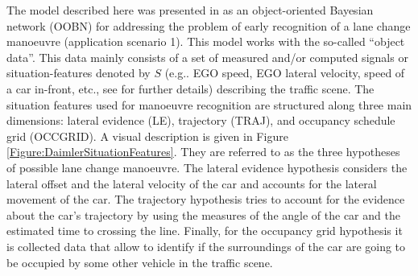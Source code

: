 The model described here was presented in \cite{kasper2012object} as an object-oriented Bayesian network  (OOBN) \cite{koller1997object} for addressing the problem of early recognition of a lane change manoeuvre (application scenario 1).  This model works with the so-called ``object data''. This data mainly consists of a set of measured and/or computed signals or situation-features denoted by $S$ (e.g.. EGO speed, EGO lateral velocity, speed of a car in-front, etc., see \cite{kasper2012object} for further details) describing the traffic scene. The situation features used for manoeuvre recognition are structured along three main dimensions: lateral evidence (LE), trajectory (TRAJ), and occupancy schedule grid (OCCGRID).  A visual description is given in Figure \ref{Figure:DaimlerSituationFeatures}. They are referred to as the three hypotheses of possible lane change manoeuvre. The lateral evidence hypothesis considers the lateral offset and the lateral velocity of the car and accounts for the lateral movement of the car. The trajectory hypothesis tries to account for the evidence about the car's trajectory by using the measures of the angle of the car and the estimated time to crossing the line. Finally, for the occupancy grid hypothesis it is collected data that allow to identify if the surroundings of the car are going to be occupied by some other vehicle in the traffic scene. 

